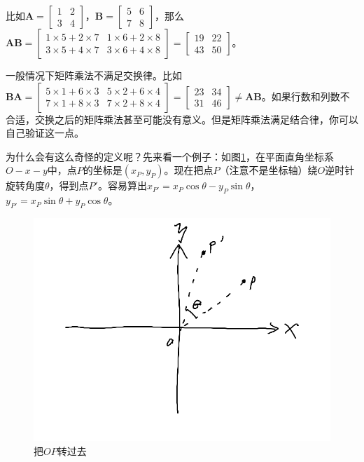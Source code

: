 比如$\mathbf{A}=\begin{bmatrix}
1 & 2 \\
3 & 4
\end{bmatrix}$，$\mathbf{B}=\begin{bmatrix}
5 & 6 \\
7 & 8
\end{bmatrix}$，那么$\mathbf{A} \mathbf{B}=\begin{bmatrix}
1 \times 5+2 \times 7 & 1 \times 6+2 \times 8 \\
3 \times 5+4 \times 7 & 3 \times 6+4 \times 8
\end{bmatrix}=\begin{bmatrix}
19 & 22 \\
43 & 50
\end{bmatrix}$。

一般情况下矩阵乘法不满足交换律。比如$\mathbf{B} \mathbf{A}=\begin{bmatrix}
5 \times 1+6 \times 3 & 5 \times 2+6 \times 4 \\
7 \times 1+8 \times 3 & 7 \times 2+8 \times 4
\end{bmatrix}=\begin{bmatrix}
23 & 34 \\
31 & 46
\end{bmatrix} \neq \mathbf{A} \mathbf{B}$。如果行数和列数不合适，交换之后的矩阵乘法甚至可能没有意义。但是矩阵乘法满足结合律，你可以自己验证这一点。

为什么会有这么奇怪的定义呢？先来看一个例子：如图\ref{fig-rotate}，在平面直角坐标系$O-x-y$中，点$P$的坐标是$(x_P, y_P)$。现在把点$P$（注意不是坐标轴）绕$O$逆时针旋转角度$\theta$，得到点$P'$。容易算出$x_{P'}=x_P \cos \theta-y_P \sin \theta$，$y_{P'}=x_P \sin \theta+y_P \cos \theta$。
\begin{figure}[htb]
\centering
\includegraphics[scale=0.5]{fig/rotate.png}
\caption{把$OP$转过去}
\label{fig-rotate}
\end{figure}

